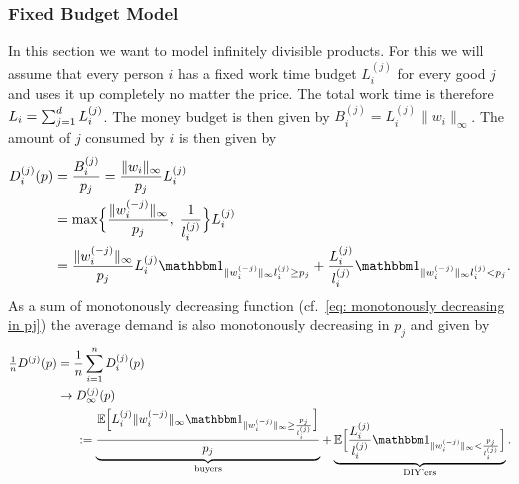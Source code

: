 \subsubsection{Fixed Budget Model}

In this section we want to model infinitely divisible products. For this we will
assume that every person \(i\) has a fixed work time budget \(L_i^{(j)}\) for
every good \(j\) and uses it up completely no matter the price. The total
work time is therefore \(L_i = \sum_{j=1}^d L_i^{(j)}\).
The money budget is then given by \(B_i^{(j)} = L_i^{(j)}\|w_i\|_\infty\). The
amount of \(j\) consumed by \(i\) is then given by
\begin{align}
	\label{eq: fixed budget and consumption relation}
	D_i^{(j)}(p)
	&= \frac{B_i^{(j)}}{p_j} = \frac{\|w_i\|_\infty}{p_j}L_i^{(j)}\\
	\label{eq: monotonously decreasing in pj}
	&= \max\Bigl\{
		\frac{\|w_i^{(-j)}\|_\infty}{p_j},\;
		\frac1{l_i^{(j)}}
	\Bigr\}L_i^{(j)}\\
	\nonumber
	&= \frac{\|w_i^{(-j)}\|_\infty}{p_j}L_i^{(j)}
	\ind_{\|w_i^{(-j)}\|_\infty l_i^{(j)} \ge p_j}
	+ \frac{L_i^{(j)}}{l_i^{(j)}}
	\ind_{\|w_i^{(-j)}\|_\infty l_i^{(j)} < p_j}.
\end{align}
As a sum of monotonously decreasing function (cf.~\eqref{eq: monotonously
decreasing in pj}) the average demand is also monotonously decreasing in \(p_j\)
and given by
\begin{align*}
	\tfrac1n D^{(j)}(p)
	&= \frac1n \sum_{i=1}^n D_i^{(j)}(p)\\
	&\to\begin{aligned}[t]
		&D_\infty^{(j)}(p)\\
		&:= \underbrace{\frac{\E\Bigl[
			L_i^{(j)}\|w_i^{(-j)}\|_\infty 
			\ind_{\|w_i^{(-j)}\|_\infty \ge \frac{p_j}{l_i^{(j)}}}
		\Bigr]}{p_j}}_{
			\text{buyers}
		}
		+ \underbrace{\E\Bigl[
			\frac{L_i^{(j)}}{l_i^{(j)}}
			\ind_{\|w_i^{(-j)}\|_\infty  < \frac{p_j}{l_i^{(j)}}}
		\Bigr]}_{\text{DIY'ers}}.
	\end{aligned}
\end{align*}


